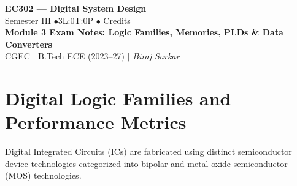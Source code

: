 \documentclass[12pt,a4paper]{article}
\begin{document}
\begin{center}
  {\LARGE\bfseries\color{myred} EC302 --- Digital System Design}\\[5pt]
  {\normalsize\color{mydark} Semester III \quad$\bullet$\quad 3L:0T:0P \quad$\bullet$ Credits}\\[3pt]
  {\normalsize\color{myteal}\textbf{Module 3 Exam Notes: Logic Families, Memories, PLDs \& Data Converters}}\\[3pt]
  {\small\color{mydark} CGEC \;$|$\; B.Tech ECE (2023--27) \;$|$\; \textit{Biraj Sarkar}}
\end{center}
\vspace{2pt}
\noindent{\color{myred}\rule{\linewidth}{1.5pt}}
\vspace{2pt}

\hypersetup{linkcolor=mydark}
\tableofcontents
\hypersetup{linkcolor=myteal}
\newpage

\section{Digital Logic Families and Performance Metrics}

Digital Integrated Circuits (ICs) are fabricated using distinct semiconductor device technologies categorized into bipolar and metal-oxide-semiconductor (MOS) technologies.
\end{document}

